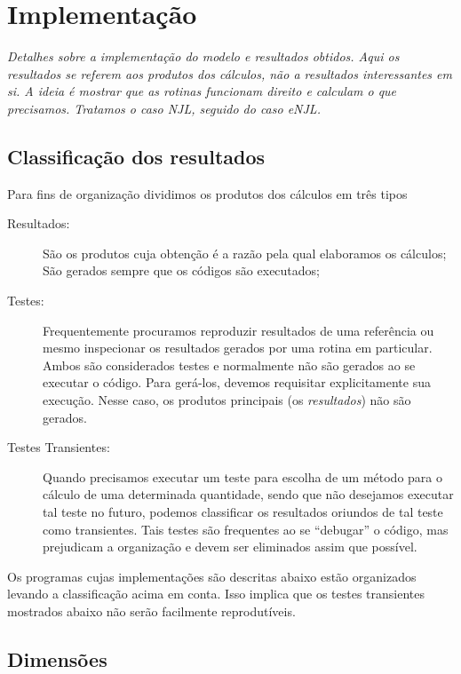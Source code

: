 \chapter{Implementação}

\begin{fullwidth}\it
Detalhes sobre a implementação do modelo e resultados obtidos. Aqui os resultados se referem aos produtos dos cálculos, não a resultados interessantes em si. A ideia é mostrar que as rotinas funcionam direito e calculam o que precisamos. Tratamos o caso NJL, seguido do caso eNJL.
\end{fullwidth}

\section{Classificação dos resultados}

Para fins de organização dividimos os produtos dos cálculos em três tipos
\begin{description}
	\item[Resultados:] São os produtos cuja obtenção é a razão pela qual elaboramos os cálculos; São gerados sempre que os códigos são executados;
	\item[Testes:] Frequentemente procuramos reproduzir resultados de uma referência ou mesmo inspecionar os resultados gerados por uma rotina em particular. Ambos são considerados testes e normalmente não são gerados ao se executar o código. Para gerá-los, devemos requisitar explicitamente sua execução. Nesse caso, os produtos principais (os \emph{resultados}) não são gerados.
	\item[Testes Transientes:] Quando precisamos executar um teste para escolha de um método para o cálculo de uma determinada quantidade, sendo que não desejamos executar tal teste no futuro, podemos classificar os resultados oriundos de tal teste como transientes. Tais testes são frequentes ao se ``debugar'' o código, mas prejudicam a organização e devem ser eliminados assim que possível.
\end{description}
%
Os programas cujas implementações são descritas abaixo estão organizados levando a classificação acima em conta. Isso implica que os testes transientes mostrados abaixo não serão facilmente reprodutíveis.

\section{Dimensões}

